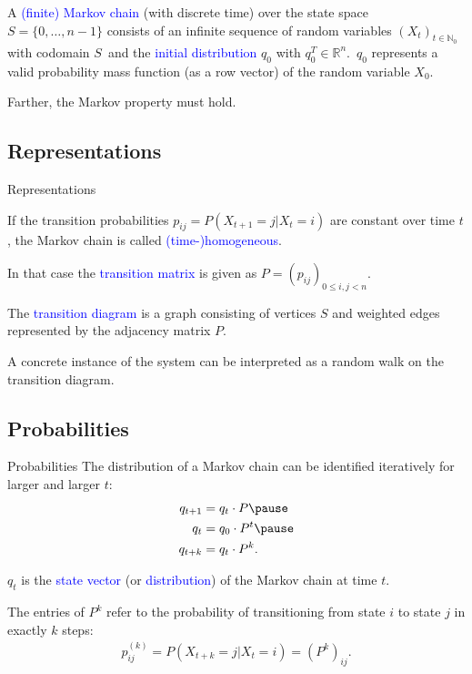 \documentclass{beamer}
\def\padding{\vspace{0.5cm}}
\def\spadding{\vspace{0.25cm}}
\def\b{\textcolor{blue}}
\begin{document}
\begin{frame}
    \begin{definition}
        A \b{(finite) Markov chain} (with discrete time) over the state space $S = \{0, \dots, n-1\}$ consists of an infinite sequence of random variables $(X_t)_{t \in \mathbb{N}_0}$ with codomain $S$\pause\ and the \b{initial distribution} $q_0$ with $q_0^T \in \mathbb{R}^n$.\pause\ $q_0$ represents a valid probability mass function (as a row vector) of the random variable $X_0$.\pause\par
        Farther, the Markov property must hold.
    \end{definition}
\end{frame}

\subsection{Representations}
\begin{frame}{Representations}
    \begin{definition}
        If the transition probabilities $p_{ij} = P(X_{t+1} = j | X_t = i)$ are constant over time $t$, the Markov chain is called \b{(time-)homogeneous}.\par\pause\spadding
        In that case the \b{transition matrix} is given as $P = (p_{ij})_{0 \leq i, j < n}$.\par\pause\spadding
        The \b{transition diagram} is a graph consisting of vertices $S$ and weighted edges represented by the adjacency matrix $P$.
    \end{definition}\par\pause\padding
    A concrete instance of the system can be interpreted as a random walk on the transition diagram.
\end{frame}

\subsection{Probabilities}
\begin{frame}{Probabilities}
    The distribution of a Markov chain can be identified iteratively for larger and larger $t$:
    \begin{align*}
        q_{t+1} &= q_t \cdot P\pause \\
        q_t     &= q_0 \cdot P^t\pause \\
        q_{t+k} &= q_t \cdot P^k.
    \end{align*}\pause
    \begin{definition}
        $q_t$ is the \b{state vector} (or \b{distribution}) of the Markov chain at time $t$.
    \end{definition}\par\pause\padding
    The entries of $P^k$ refer to the probability of transitioning from state $i$ to state $j$ in exactly $k$ steps:
    \begin{align*}
        p_{ij}^{(k)} = P(X_{t+k} = j | X_t = i) = (P^k)_{ij}.
    \end{align*}
\end{frame}
\end{document}
